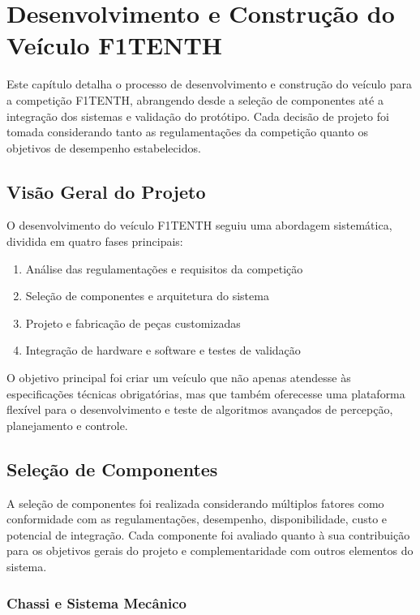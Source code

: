 \chapter{Desenvolvimento e Construção do Veículo F1TENTH}

Este capítulo detalha o processo de desenvolvimento e construção do veículo
para a competição F1TENTH, abrangendo desde a seleção de componentes até a
integração dos sistemas e validação do protótipo. Cada decisão de projeto foi
tomada considerando tanto as regulamentações da competição quanto os objetivos
de desempenho estabelecidos.

\section{Visão Geral do Projeto}

O desenvolvimento do veículo F1TENTH seguiu uma abordagem sistemática, dividida
em quatro fases principais:

\begin{enumerate}
    \item Análise das regulamentações e requisitos da competição
    \item Seleção de componentes e arquitetura do sistema
    \item Projeto e fabricação de peças customizadas
    \item Integração de hardware e software e testes de validação
\end{enumerate}

O objetivo principal foi criar um veículo que não apenas atendesse às
especificações técnicas obrigatórias, mas que também oferecesse uma plataforma
flexível para o desenvolvimento e teste de algoritmos avançados de percepção,
planejamento e controle.

\section{Seleção de Componentes}

A seleção de componentes foi realizada considerando múltiplos fatores como
conformidade com as regulamentações, desempenho, disponibilidade, custo e
potencial de integração. Cada componente foi avaliado quanto à sua contribuição
para os objetivos gerais do projeto e complementaridade com outros elementos do
sistema.

\subsection{Chassi e Sistema Mecânico}

